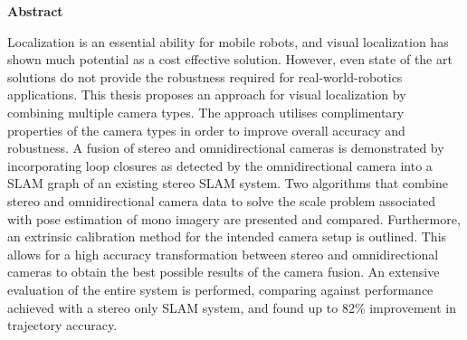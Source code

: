\clearemptydoublepage
{}
{}

\vspace*{1cm}
\begin{center}
{\Large \bf Abstract}
\end{center}
\vspace{1cm}

Localization is an essential ability for mobile robots, and visual localization has shown much potential as a cost effective solution.  However, even state of the art solutions do not provide the robustness required for real-world-robotics applications. This thesis proposes an approach for visual localization by combining multiple camera types.  The approach utilises complimentary properties of the camera types in order to improve overall accuracy and robustness. A fusion of stereo and omnidirectional cameras is demonstrated by incorporating loop closures as detected by the omnidirectional camera into a SLAM graph of an existing stereo SLAM system.  Two algorithms that combine stereo and omnidirectional camera data to solve the scale problem associated with pose estimation of mono imagery are presented and compared.  Furthermore, an extrinsic calibration method for the intended camera setup is outlined.  This allows for a high accuracy transformation between stereo and omnidirectional cameras to obtain the best possible results of the camera fusion. An extensive evaluation of the entire system is performed, comparing against performance achieved with a stereo only SLAM system, and found up to 82\% improvement in trajectory accuracy.

